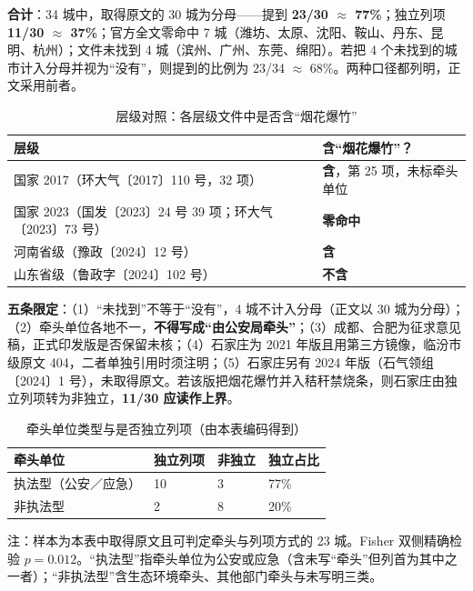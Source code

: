 \vspace{0.3em}
\endgroup

\vspace{0.6em}
\noindent\textbf{合计}：34 城中，取得原文的 30 城为分母——提到 \textbf{23/30 $\approx$ 77\%}；独立列项 \textbf{11/30 $\approx$ 37\%}；官方全文零命中 7 城（潍坊、太原、沈阳、鞍山、丹东、昆明、杭州）；文件未找到 4 城（滨州、广州、东莞、绵阳）。若把 4 个未找到的城市计入分母并视为“没有”，则提到的比例为 23/34 $\approx$ 68\%。两种口径都列明，正文采用前者。

\begin{table}[H]
\centering
\caption{层级对照：各层级文件中是否含“烟花爆竹”}
\label{tab:levels}
\small
\begin{tabular}{L{8.4cm}L{6.2cm}}
\toprule
\textbf{层级} & \textbf{含“烟花爆竹”？} \\
\midrule
国家 2017（环大气〔2017〕110 号，32 项） & \textbf{含}，第 25 项，未标牵头单位 \\
国家 2023（国发〔2023〕24 号 39 项；环大气〔2023〕73 号） & \textbf{零命中} \\
河南省级（豫政〔2024〕12 号） & \textbf{含} \\
山东省级（鲁政字〔2024〕102 号） & \textbf{不含} \\
\bottomrule
\end{tabular}
\end{table}

\noindent\textbf{五条限定}：（1）“未找到”不等于“没有”，4 城不计入分母（正文以 30 城为分母）；（2）牵头单位各地不一，\textbf{不得写成“由公安局牵头”}；（3）成都、合肥为征求意见稿，正式印发版是否保留未核；（4）石家庄为 2021 年版且用第三方镜像，临汾市级原文 404，二者单独引用时须注明；（5）石家庄另有 2024 年版（石气领组〔2024〕1 号），未取得原文。若该版把烟花爆竹并入秸秆禁烧条，则石家庄由独立列项转为非独立，\textbf{11/30 应读作上界}。

\begin{table}[H]
\centering
\caption{牵头单位类型与是否独立列项（由本表编码得到）}
\label{tab:lead-app}
\small
\begin{tabular}{L{3.8cm}R{2.4cm}R{2.4cm}R{2.6cm}}
\toprule
\textbf{牵头单位} & \textbf{独立列项} & \textbf{非独立} & \textbf{独立占比} \\
\midrule
执法型（公安／应急） & 10 & 3 & 77\% \\
非执法型 & 2 & 8 & 20\% \\
\bottomrule
\end{tabular}

\vspace{0.3em}
{\small 注：样本为本表中取得原文且可判定牵头与列项方式的 23 城。Fisher 双侧精确检验 $p=0.012$。“执法型”指牵头单位为公安或应急（含未写“牵头”但列首为其中之一者）；“非执法型”含生态环境牵头、其他部门牵头与未写明三类。}
\end{table}
